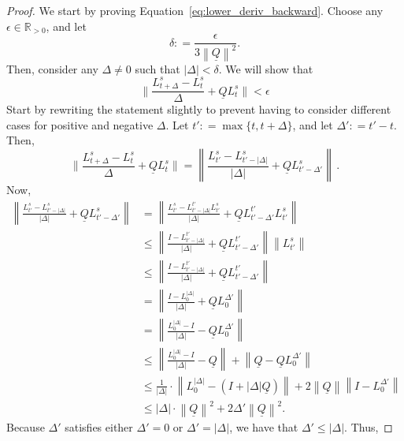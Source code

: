 \documentclass[10pt]{paper}
\newcommand{\reals}{\mathbb{R}}
\newcommand{\realspos}{\reals_{>0}}
\newcommand{\lrate}{\underline{Q}}
\newcommand{\norm}[1]{\left\lVert #1 \right\rVert}
\newcommand{\coloneqq}{:\!=}
\begin{document}
\begin{proof}
We start by proving Equation~\eqref{eq:lower_deriv_backward}. Choose any $\epsilon\in\realspos$, and let
\begin{equation}\label{eq:derivative_max_delta}
\delta \coloneqq \frac{\epsilon}{3\norm{\lrate}^2}.
\end{equation}
Then, consider any $\Delta\neq 0$ such that $\lvert\Delta\rvert<\delta$. We will show that
\begin{equation*}
\Big\lVert\frac{L_{t+\Delta}^s-L_t^s}{\Delta}+\lrate L_t^s\Big\rVert<\epsilon
\end{equation*}
Start by rewriting the statement slightly to prevent having to consider different cases for positive and negative $\Delta$. Let $t'\coloneqq\max\{t,t+\Delta\}$, and let $\Delta'\coloneqq t'-t$. Then,
\begin{equation*}
\Big\lVert\frac{L_{t+\Delta}^s-L_t^s}{\Delta}+\lrate L_t^s\Big\rVert = \norm{\frac{L_{t'}^s - L_{t'-\lvert\Delta\rvert}^s}{\lvert\Delta\rvert}+\lrate L_{t'-\Delta'}^s}\,.
\end{equation*}
Now,
\begin{align*}
\norm{\frac{L_{t'}^s - L_{t'-\lvert\Delta\rvert}^s}{\lvert\Delta\rvert}+\lrate L_{t'-\Delta'}^s} &= \norm{\frac{L_{t'}^s - L_{t'-\lvert\Delta\rvert}^{t'}L_{t'}^s}{\lvert\Delta\rvert}+\lrate L_{t'-\Delta'}^{t'}L_{t'}^s} \\
 &\leq \norm{\frac{I - L_{t'-\lvert\Delta\rvert}^{t'}}{\lvert\Delta\rvert}+\lrate L_{t'-\Delta'}^{t'}}\norm{L_{t'}^s} \\
 &\leq \norm{\frac{I - L_{t'-\lvert\Delta\rvert}^{t'}}{\lvert\Delta\rvert}+\lrate L_{t'-\Delta'}^{t'}} \\
 &= \norm{\frac{I - L_{0}^{\lvert\Delta\rvert}}{\lvert\Delta\rvert}+\lrate L_{0}^{\Delta'}} \\
 &= \norm{\frac{L_{0}^{\lvert\Delta\rvert} - I}{\lvert\Delta\rvert}-\lrate L_{0}^{\Delta'}} \\
 &\leq \norm{\frac{L_{0}^{\lvert\Delta\rvert} - I}{\lvert\Delta\rvert}-\lrate} + \norm{\lrate - \lrate L_{0}^{\Delta'}} \\
 &\leq \frac{1}{\lvert\Delta\rvert}\cdot\norm{L_{0}^{\lvert\Delta\rvert} - (I+\lvert\Delta\rvert\lrate)} + 2\norm{\lrate}\norm{I - L_{0}^{\Delta'}} \\
 &\leq \lvert\Delta\rvert\cdot\norm{\lrate}^2 + 2\Delta'\norm{\lrate}^2.
\end{align*}
Because $\Delta'$ satisfies either $\Delta'=0$ or $\Delta'=\lvert\Delta\rvert$, we have that $\Delta'\leq\lvert\Delta\rvert$. Thus,

\end{proof}
\end{document}
